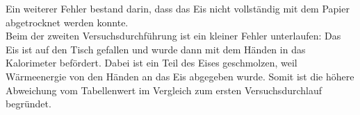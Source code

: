 \documentclass[a4paper,12pt]{article}
\begin{document}
Ein weiterer Fehler bestand darin, dass das Eis nicht vollständig mit dem Papier abgetrocknet werden konnte.\\

Beim der zweiten Versuchsdurchführung ist ein kleiner Fehler unterlaufen: Das Eis ist auf den Tisch gefallen und wurde dann mit dem Händen in das Kalorimeter befördert. Dabei ist ein Teil des Eises geschmolzen, weil Wärmeenergie von den Händen an das Eis abgegeben wurde. Somit ist die höhere Abweichung vom Tabellenwert im Vergleich zum ersten Versuchsdurchlauf begründet.
\end{document}
